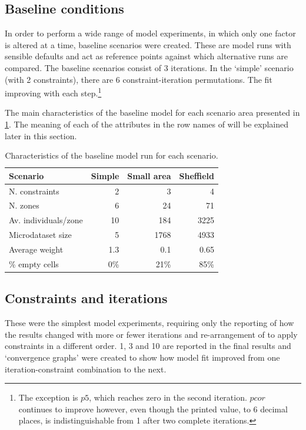 \documentclass[a4paper,10pt]{article}
\begin{document}
\subsection{Baseline conditions} \label{smbase}
In order to perform a wide range of model experiments, 
in which only one factor is altered at a time, 
baseline scenarios were created. These are model runs with sensible 
defaults and act as reference points against which alternative runs are compared.
The baseline scenarios consist of 3 iterations. In the `simple' scenario (with 2 constraints), 
there are 6 constraint-iteration permutations.
The
fit improving with each step.\footnote{The exception is $p5$,
which reaches zero in the second iteration. $pcor$ continues to improve however, 
even though the printed value, to 6 decimal places, is
indistinguishable from 1 after two complete iterations.}

The main characteristics of the baseline model for each scenario area
presented in \cref{tbase}. The meaning of each of the attributes in the
row names of will be explained later in this section.

\begin{table}[htbp]
\caption{Characteristics of the baseline model run for each scenario.}
\begin{center}
\begin{tabular}{lrrr}
\toprule
Scenario & \multicolumn{1}{l}{Simple} & \multicolumn{1}{l}{Small area} & \multicolumn{1}{l}{Sheffield} \\
\midrule
N. constraints & 2 & 3 & 4 \\
N. zones & 6 & 24 & 71 \\
Av. individuals/zone & 10 & 184 & 3225 \\
Microdataset size & 5 & 1768 & 4933 \\
Average weight & 1.3 & 0.1 & 0.65 \\
\% empty cells & 0\% & 21\% & 85\% \\
\bottomrule
\end{tabular}
\label{tbase}
\end{center}
\end{table}



\subsection{Constraints and iterations}
These were the simplest model experiments, requiring only
the reporting of how the results changed with more or fewer
iterations and re-arrangement of to apply constraints
in a different order. 1, 3 and 10 are reported in the final
results and `convergence graphs' were created to show how model
fit improved from one iteration-constraint combination to the next.
\end{document}
